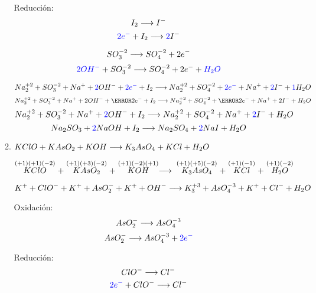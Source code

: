 \documentclass[../Práctica.root.tex]{subfiles}
\begin{document}
\begin{enumerate}
\begin{enumerate}
\begin{multicols}{2}
                        \columnbreak

                        Reducción:
                        \[ I_2 \longrightarrow{} I^- \]
                        \[ \textcolor{blue}{2e^-} + I_2 \longrightarrow{} \textcolor{blue}{2} I^- \]
                    \end{multicols}


                    \[ SO_3^{-2} \longrightarrow{} SO_4^{-2} + 2 e^- \]
                    \[ \textcolor{blue}{2 OH^-} + SO_3^{-2} \longrightarrow{} SO_4^{-2} + 2 e^- + \textcolor{blue}{H_2O} \]

                    \[ Na_2^{+2} + SO_3^{-2} + Na^+ + \textcolor{blue}{2} OH^- + \textcolor{blue}{2 e^-} + I_2 \\
                        \longrightarrow{} Na_2^{+2} + SO_4^{-2} + \textcolor{blue}{2 e^-} + Na^+ + \textcolor{blue}{2} I^- + \textcolor{blue}{1} H_2O \]
                    \[ Na_2^{+2} + SO_3^{-2} + Na^+ + 2 OH^- + \cancel{2 e^-} + I_2 \\
                        \lra Na_2^{+2} + SO_4^{-2} + \cancel{2 e^-} + Na^+ + 2 I^- + H_2O \]
                    \[ Na_2^{+2} + SO_3^{-2} + Na^+ + \textcolor{blue}{2} OH^- + I_2 \\
                        \longrightarrow{} Na_2^{+2} + SO_4^{-2} + Na^+ + \textcolor{blue}{2} I^- + H_2O \]
                    \[ Na_2SO_3 + \textcolor{blue}{2} NaOH + I_2 \longrightarrow{} Na_2SO_4 + \textcolor{blue}{2} NaI + H_2O \]

              \item $KClO + KAsO_2 + KOH \longrightarrow{} K_3AsO_4 + KCl + H_2O$

                    $\stackrel{(+1)(+1)(-2)}{KClO} + \stackrel{(+1)(+3)(-2)}{KAsO_2} + \stackrel{(+1)(-2)(+1)}{KOH}
                        \longrightarrow{} \stackrel{(+1)(+5)(-2)}{K_3AsO_4} + \stackrel{(+1)(-1)}{KCl} + \stackrel{(+1)(-2)}{H_2O}$

                    \[ K^+ + ClO^- + K^+ + AsO_2^- + K^+ + OH^- \longrightarrow{} K_3^{+3} + AsO_4^{-3} + K^+ + Cl^- + H_2O \]
                    \begin{multicols}{2}
                        Oxidación:
                        \[ AsO_2^- \longrightarrow{} AsO_4^{-3} \]
                        \[ AsO_2^- \longrightarrow{} AsO_4^{-3} + \textcolor{blue}{2e^-} \]

                        \columnbreak

                        Reducción:
                        \[ ClO^- \longrightarrow{} Cl^- \]
                        \[ \textcolor{blue}{2e^-} + ClO^- \longrightarrow{} Cl^- \]
                    \end{multicols}


\end{enumerate}
\end{enumerate}
\end{document}
